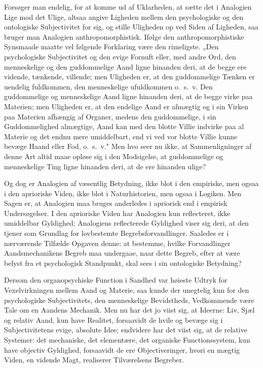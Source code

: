 \documentclass[12pt]{book}
\newcommand{\opage}[1]{\marginnote{\footnotesize\textit{[#1]}}}
\begin{document}
Forsøger man endelig, for at komme ud af Uklarheden, at sætte det i Analogien Lige mod det Ulige,
altsaa angive Ligheden mellem den psychologiske og den ontologiske Subjectivitet for sig, og stille
Uligheden op ved Siden af Ligheden, saa bruger
\opage{425} man Analogien anthropomorphistisk. Ifølge den anthropomorphistiske Synsmaade maatte vel følgende
Forklaring være den rimeligste. „Den psychologiske Subjectivitet og den evige Fornuft eller, med
andre Ord, den menneskelige og den guddommelige Aand ligne hinanden deri, at de begge ere vidende,
tænkende, villende; men Uligheden er, at den guddommelige Tænken er uendelig fuldkommen, den
menneskelige ufuldkommen o.\ s.\ v. Den guddommelige og menneskelige Aand ligne hinanden deri, at de
begge virke paa Materien; men Uligheden er, at den endelige Aand er afmægtig og i sin Virken paa
Materien afhængig af Organer, medens den guddommelige, i sin Guddommelighed almægtige, Aand kan med
den blotte Villie indvirke paa al Materie og det endnu mere umiddelbart, end vi ved vor blotte Villie
kunne bevæge Haand eller Fod, o.\ s.\ v." Men hvo seer nu ikke, at Sammenligninger af denne Art altid
maae opløse sig i den Modsigelse, at guddommelige og menneskelige Ting ligne hinanden deri, at de ere
hinanden ulige?

Og dog er Analogien af væsentlig Betydning, ikke blot i den empiriske, men ogsaa i den aprioriske
Viden, ikke blot i Naturhistorien, men ogsaa i Logiken. Men Sagen er, at Analogien maa bruges
anderledes i apriorisk end i empirisk Undersøgelser. I den aprioriske Viden har Analogien kun
reflecteret, ikke umiddelbar Gyldighed; Analogiens reflecterede Gyldighed viser sig deri, at den
tjener som Grundlag for lovbestemte Begrebsforvandlinger. Saaledes er i nærværende Tilfælde Opgaven
denne: at bestemme, hvilke Forvandlinger Aandsmechanikens Begreb maa undergaae, naar dette Begreb,
efter at være belyst fra et psychologisk Standpunkt, skal sees i sin ontologiske Betydning?

Dersom den organopsychiske Function i Sandhed var høieste Udtryk for Vexelvirkningen mellem Aand og
Materie, saa kunde der unegtelig kun for den psychologiske Subjectivitets, den menneskelige
Bevidstheds, Vedkommende være Tale om en
\opage{426} Aandens Mechanik. Men nu har det jo viist sig, at Ideerne: Liv, Sjæl og relativ Aand, kun have
Realitet, forsaavidt de hvile og bevæge sig i Subjectivitetens evige, absolute Idee; endvidere har
det viist sig, at de relative Systemer: det mechaniske, det elementære, det organiske
Functionssystem, kun have objectiv Gyldighed, forsaavidt de ere Objectiveringer, hvori en mægtig
Viden, en vidende Magt, realiserer Tilværelsens Begreber.
\end{document}
